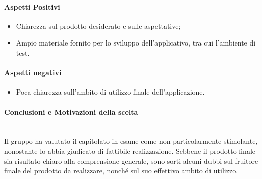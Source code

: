 \paragraph{Aspetti Positivi}
  \begin{itemize}
    \item Chiarezza sul prodotto desiderato e sulle aspettative;
    \item Ampio materiale fornito per lo sviluppo dell'applicativo, tra cui l'ambiente di test.
  \end{itemize}
\paragraph{Aspetti negativi}
  \begin{itemize}
    \item Poca chiarezza sull'ambito di utilizzo finale dell'applicazione.
  \end{itemize}

\paragraph{Conclusioni e Motivazioni della scelta}\-\\
Il gruppo ha valutato il capitolato in esame come non particolarmente stimolante, nonostante lo abbia giudicato di fattibile realizzazione. Sebbene il prodotto finale sia risultato chiaro alla comprensione generale, sono sorti alcuni dubbi sul fruitore finale del prodotto da realizzare, nonché sul suo effettivo ambito di utilizzo.
